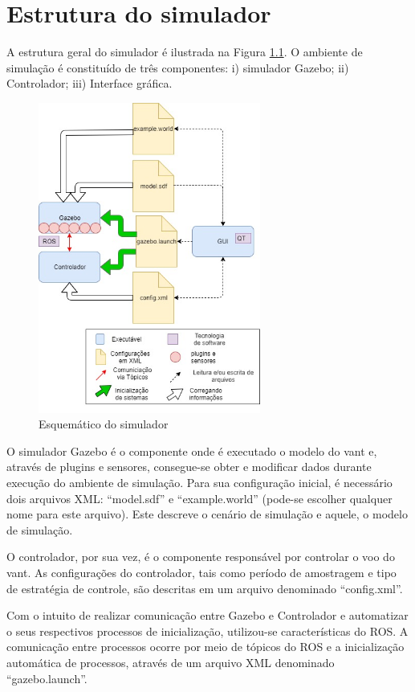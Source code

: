 \chapter{Estrutura do simulador}

A estrutura geral do simulador é ilustrada na Figura \ref{Esquematico.jpg}. O ambiente de simulação é constituído de três componentes: i) simulador Gazebo; ii) Controlador; iii) Interface gráfica. 


\begin{figure}[H]
	\centering
	\includegraphics[width=0.65\textwidth]{figuras/estrutura.jpg}
	\caption{Esquemático do simulador}
	\label{Esquematico.jpg}
\end{figure}

O simulador Gazebo é o componente onde é executado o modelo do vant e, através de plugins e sensores, consegue-se obter e modificar dados durante execução do ambiente de simulação. Para sua configuração inicial, é necessário dois arquivos XML: ``model.sdf'' e ``example.world'' (pode-se escolher qualquer nome para este arquivo). Este descreve o cenário de simulação e aquele, o modelo de simulação.

O controlador, por sua vez, é o componente responsável por controlar o voo do vant. As configurações do controlador, tais como período de amostragem e tipo de estratégia de controle, são descritas em um arquivo denominado ``config.xml''.

Com o intuito de realizar comunicação entre Gazebo e Controlador e automatizar o seus respectivos processos de inicialização, utilizou-se características do ROS. A comunicação entre processos ocorre por meio de tópicos do ROS e a inicialização automática de processos, através de um arquivo XML denominado ``gazebo.launch''.

